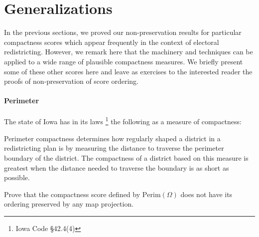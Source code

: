 \section{Generalizations}

In the previous sections, we proved our non-preservation results for particular compactness scores which appear frequently in the context of electoral redistricting.  However, we remark here that the machinery and techniques can be applied to a wide range of plausible compactness measures.  We briefly present some of these other scores here and leave as exercises to the interested reader the proofs of non-preservation of score ordering.

\paragraph{Perimeter} 

The state of Iowa has in its laws \footnote{Iowa Code \S42.4(4)} the following as a measure of compactness:

\begin{displayquote}
	
	Perimeter compactness determines how regularly shaped a district in a
	redistricting plan is by measuring the distance to traverse the perimeter boundary of
	the district. The compactness of a district based on this measure is greatest when
	the distance needed to traverse the boundary is as short as possible. 
	
	\end{displayquote}

Prove that the compactness score defined by $\mathrm{Perim}(\Omega)$ does not have its ordering preserved by any map projection.



	
	